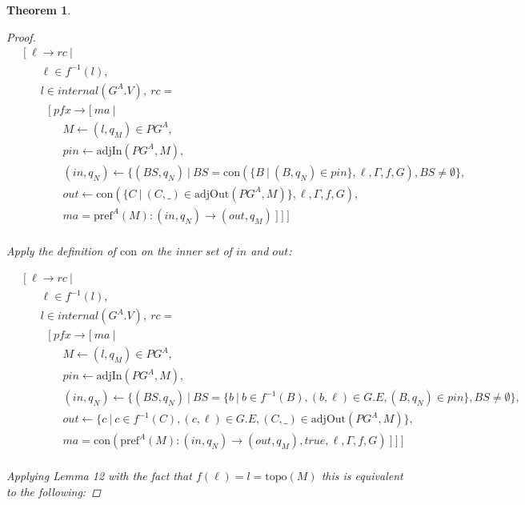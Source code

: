 \documentclass[twocolumn, openany]{sig-alternate-10pt}
\newcommand{\Con}{\mathrm{con}}
\newcommand{\Pref}{\ensuremath{\mathrm{pref}}}
\newcommand{\Topo}{\ensuremath{\mathrm{topo}}}
\newtheorem{thm}{Theorem}
\begin{document}
\begin{thm}
\begin{proof}
    \[ \begin{array}{l}
     ~~~~~ [~ \ell \rightarrow rc ~\vert~ \\
     ~~~~~~~~~~~~ \ell \in f^{-1}(l), \\
     ~~~~~~~~~~~~ l \in internal(G^A.V), ~rc =  \\
     ~~~~~~~~~~~~~~~ [~ pfx \rightarrow [~ ma ~\vert~ \\
     ~~~~~~~~~~~~~~~~~~~~~ M \leftarrow (l,q_M) \in PG^A, \\
     ~~~~~~~~~~~~~~~~~~~~~ pin \leftarrow \text{adjIn}(PG^A,M), \\
     ~~~~~~~~~~~~~~~~~~~~~ (in,q_N) \leftarrow \{ (BS,q_N) ~\vert~ BS=\Con(\{B ~\vert~ (B,q_N) \in pin \}, \ell, \Gamma, f, G), BS \neq \emptyset \}, \\
     ~~~~~~~~~~~~~~~~~~~~~ out \leftarrow \Con(\{ C ~\vert~ (C,\_) \in \text{adjOut}(PG^A,M) \}, \ell,\Gamma,f,G), \\
     ~~~~~~~~~~~~~~~~~~~~~ ma = \Pref^A(M) : (in,q_N) \rightarrow (out,q_M) ~] ~] ~] \\
  \end{array} \]%

  Apply the definition of $\Con$ on the inner set of $in$ and $out$:

    \[ \begin{array}{l}
     ~~~~~ [~ \ell \rightarrow rc ~\vert~ \\
     ~~~~~~~~~~~~ \ell \in f^{-1}(l), \\
     ~~~~~~~~~~~~ l \in internal(G^A.V), ~rc =  \\
     ~~~~~~~~~~~~~~~ [~ pfx \rightarrow [~ ma ~\vert~ \\
     ~~~~~~~~~~~~~~~~~~~~~ M \leftarrow (l,q_M) \in PG^A, \\
     ~~~~~~~~~~~~~~~~~~~~~ pin \leftarrow \text{adjIn}(PG^A,M), \\
     ~~~~~~~~~~~~~~~~~~~~~ (in,q_N) \leftarrow \{ (BS,q_N) ~\vert~ BS=\{b ~\vert~ b \in f^{-1}(B), (b,\ell)\in G.E, (B,q_N) \in pin \}, BS \neq \emptyset \}, \\
     ~~~~~~~~~~~~~~~~~~~~~ out \leftarrow \{ c ~\vert~ c \in f^{-1}(C), (c,\ell)\in G.E, (C,\_) \in \text{adjOut}(PG^A,M) \}, \\
     ~~~~~~~~~~~~~~~~~~~~~ ma = \Con(\Pref^A(M) : (in,q_N) \rightarrow (out,q_M), true, \ell, \Gamma, f, G) ~] ~] ~] \\
  \end{array} \]%

  Applying Lemma 12 with the fact that $f(\ell) = l = \Topo(M)$ this is equivalent to the following:


\end{proof}
\end{thm}
\end{document}
